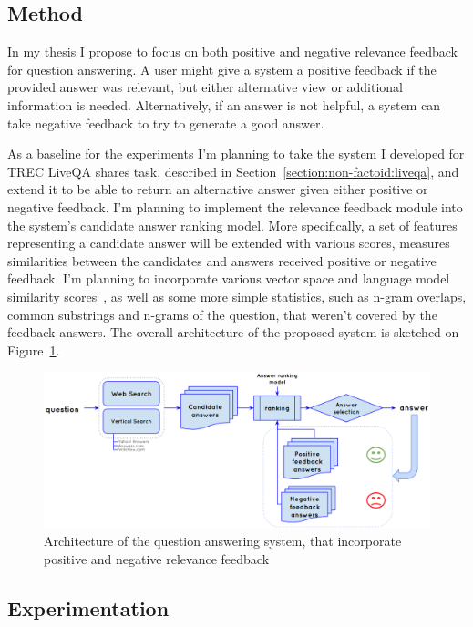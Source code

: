 \subsection{Method}
\label{section:users:proposal:method}

In my thesis I propose to focus on both positive and negative relevance feedback for question answering.
A user might give a system a positive feedback if the provided answer was relevant, but either alternative view or additional information is needed.
Alternatively, if an answer is not helpful, a system can take negative feedback to try to generate a good answer.

As a baseline for the experiments I'm planning to take the system I developed for TREC LiveQA shares task, described in Section~\ref{section:non-factoid:liveqa}, and extend it to be able to return an alternative answer given either positive or negative feedback.
I'm planning to implement the relevance feedback module into the system's candidate answer ranking model.
More specifically, a set of features representing a candidate answer will be extended with various scores, measures similarities between the candidates and answers received positive or negative feedback.
I'm planning to incorporate various vector space and language model similarity scores~\cite{wang2008study}, as well as some more simple statistics, such as n-gram overlaps, common substrings and n-grams of the question, that weren't covered by the feedback answers.
The overall architecture of the proposed system is sketched on Figure~\ref{figure:users:proposal:model}.

\begin{figure}
\centering
\includegraphics[width=\textwidth]{img/userfeedback_model}
\caption{Architecture of the question answering system, that incorporate positive and negative relevance feedback}
\label{figure:users:proposal:model}
\end{figure}

\subsection{Experimentation}
\label{section:users:proposal:experiments}

